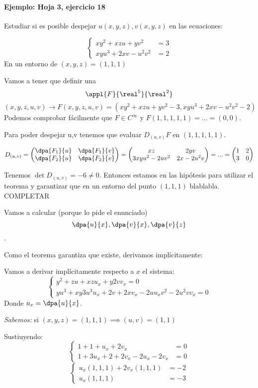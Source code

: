 \paragraph{Ejemplo: Hoja 3, ejercicio 18}

Estudiar si es posible despejar $u(x,y,z), v(x,y,z)$ en las ecuaciones:

\[\left\{\begin{matrix} xy^2+xzu+yv^2 &= 3\\ xyu^3+2xv-u^2v^2 &= 2\end{matrix}\right.\]
En un entorno de $(x,y,z) = (1,1,1)$

Vamos a tener que definir una 
\[\appl{F}{\real^5}{\real^2}\]
\[(x,y,z,u,v) \rightarrow F(x,y,z,u,v)= (xy^2+xzu+yv^2-3,xyu^3+2xv-u^2v^2-2)\]
Podemos comprobar fácilmente que $F\in C^{\infty}$ y $F(1,1,1,1,1) = ... = (0,0)$.

Para poder despejar u,v tenemos que evaluar $D_{(u,v)}F$ en $(1,1,1,1,1)$.

\[D_{(u,v)} = \begin{pmatrix} \dpa{F_1}{u}&\dpa{F_1}{v}\\ \dpa{F_2}{u} &\dpa{F_2}{v}\end{pmatrix} 
= \begin{pmatrix} xz & 2yv\\3xyu^2-2uv^2 & 2x-2u^2v \end{pmatrix} = ... = \begin{pmatrix} 1&2\\ 3&0 \end{pmatrix}\]

Tenemos $\det D_{(u,v)} = -6 \neq 0$. Entonces estamos en las hipótesis para utilizar el teorema y garantizar que en un entorno del punto $(1,1,1)$ blablabla.
COMPLETAR

Vamos a calcular (porque lo pide el enunciado) \[\dpa{u}{x},\dpa{v}{x},\dpa{v}{z}\].

Como el teorema garantiza que existe, derivamos implícitamente:

Vamos a derivar implícitamente respecto a $x$ el sistema:
\[\left\{\begin{matrix} y^2+zu+xzu_x + y 2v v_x = 0 \\ yu^3+xy3u^3u_x  + 2v + 2xv_x - 2uu_xv^2-2u^2vv_x = 0 \end{matrix}\right.\]
Donde $u_x = \dpa{u}{x}$.

\emph{Sabemos:} si $(x,y,z) = (1,1,1) \implies (u,v) = (1,1)$

Sustiuyendo:
\[\left\{\begin{matrix}1+1+u_x+2v_x &= 0 \\ 1+3u_x+2+2v_x-2u_x-2v_x &= 0\end{matrix}\right.\]
\[\left\{\begin{matrix}u_x(1,1,1) + 2v_x(1,1,1) &= -2\\ u_x(1,1,1) &= -3 \end{matrix}\right.\]

